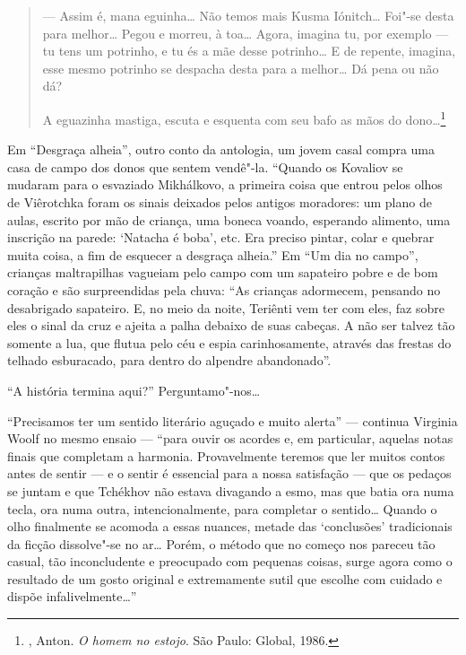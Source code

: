 \begin{quotation}
--- Assim é, mana eguinha\ldots{} Não temos mais Kusma
Iónitch\ldots{} Foi"-se desta para melhor\ldots{} Pegou e morreu,
à toa\ldots{} Agora, imagina tu, por exemplo --- tu tens um
potrinho, e tu és a mãe desse potrinho\ldots{} E de repente,
imagina, esse mesmo potrinho se despacha desta para a melhor\ldots{}
Dá pena ou não dá?

A eguazinha mastiga, escuta e esquenta com seu bafo as mãos do
dono\ldots{}\footnote{, Anton. \emph{O homem no
estojo}. São Paulo: Global, 1986.}
\end{quotation}

Em ``Desgraça alheia'', outro conto da antologia, um jovem casal
compra uma casa de campo dos donos que sentem vendê"-la. ``Quando
os Kovaliov se mudaram para o esvaziado Mikhálkovo, a primeira
coisa que entrou pelos olhos de Viêrotchka foram os sinais
deixados pelos antigos moradores: um plano de aulas, escrito por
mão de criança, uma boneca voando, esperando alimento, uma
inscrição na parede: `Natacha é boba', etc. Era preciso pintar,
colar e quebrar muita coisa, a fim de esquecer a desgraça alheia.''
Em ``Um dia no campo'', crianças maltrapilhas vagueiam pelo campo
com um sapateiro pobre e de bom coração e são surpreendidas pela
chuva: ``As crianças adormecem, pensando no desabrigado sapateiro.
E, no meio da noite, Teriênti vem ter com eles, faz sobre eles o
sinal da cruz e ajeita a palha debaixo de suas cabeças. A não ser
talvez tão somente a lua, que flutua pelo céu e espia carinhosamente,
através das frestas do telhado esburacado, para dentro do alpendre
abandonado''.

``A história termina aqui?'' Perguntamo"-nos\ldots{}

``Precisamos ter um sentido
literário aguçado e muito alerta'' ---
continua Virginia Woolf no mesmo ensaio --- ``para
ouvir os acordes e, em particular, aquelas notas finais que completam a harmonia.
Provavelmente teremos que ler muitos contos antes de sentir ---
e o sentir é essencial para a nossa satisfação --- que os pedaços
se juntam e que Tchékhov não estava divagando a esmo, mas que batia
ora numa tecla, ora numa outra, intencionalmente, para completar o
sentido\ldots{} Quando o olho finalmente se acomoda a essas nuances,
metade das `conclusões' tradicionais da ficção dissolve"-se no
ar\ldots{} Porém, o método que no começo nos pareceu tão casual,
tão inconcludente e preocupado com pequenas coisas, surge agora
como o resultado de um gosto original e extremamente sutil que
escolhe com cuidado e dispõe infalivelmente\ldots{}''


